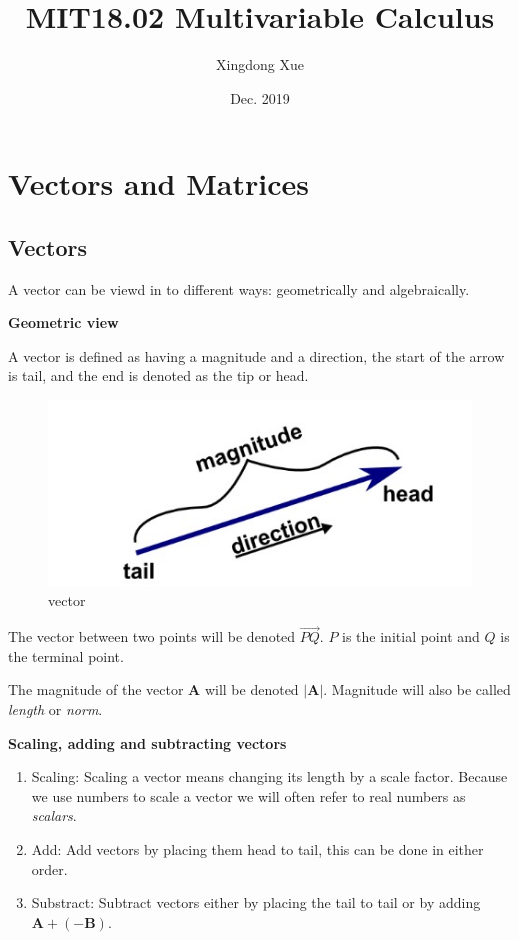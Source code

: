 \documentclass{article}
\title{MIT18.02 Multivariable Calculus}
\author{Xingdong Xue}
\date{Dec. 2019}
\begin{document}
\maketitle

\section{Vectors and Matrices}
\subsection{Vectors}
A vector can be viewd in to different ways: geometrically and algebraically.

\textbf{Geometric view}

A vector is defined as having a magnitude and a direction, the start of the arrow is tail, and the end is denoted as the tip or head.
\begin{figure}[htbp]
  \centering
  \includegraphics[width=.8\textwidth]{vector.jpg}
  \caption{vector}
  \label{vector}
\end{figure}

The vector between two points will be denoted $\overrightarrow{PQ}$. $P$ is the initial point and $Q$ is the terminal point.

The magnitude of the vector \textbf{A} will be denoted $\mathbf{\left| A \right|}$. Magnitude will also be called \textit{length} or \textit{norm}.

\textbf{Scaling, adding and subtracting vectors}

\begin{enumerate}
  \item Scaling: Scaling a vector means changing its length by a scale factor. Because we use numbers to scale a vector we will often refer to real numbers as \textit{scalars}.
  \item Add: Add vectors by placing them head to tail, this can be done in either order.
  \item Substract: Subtract vectors either by placing the tail to tail or by adding $\mathbf{A+(-B)}$.
\end{enumerate}
\end{document}
